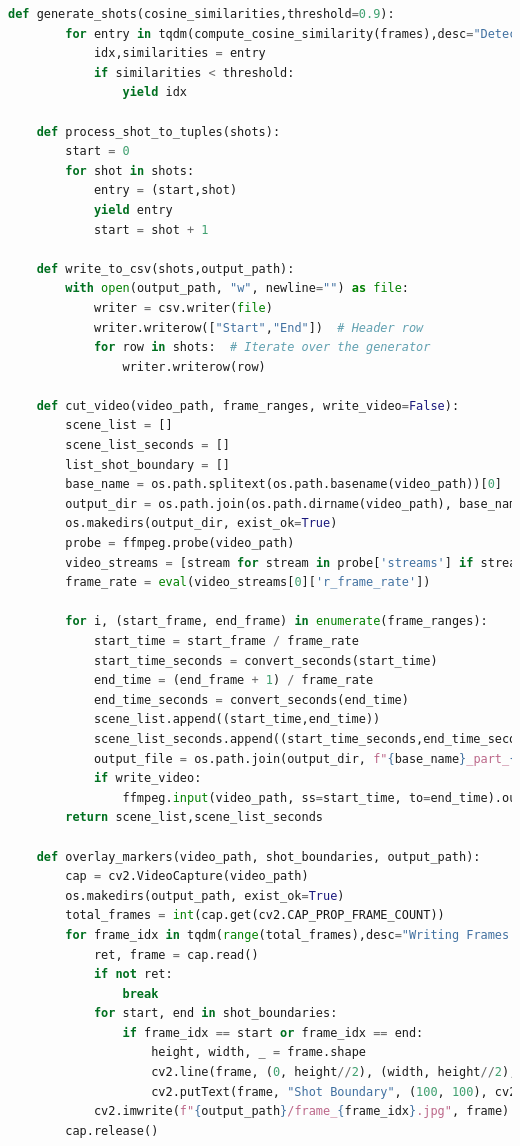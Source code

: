 \documentclass[12pt]{report}
\begin{document}
\begin{lstlisting}[language=Python,caption={Shot Boundary Detection Code}]
	def generate_shots(cosine_similarities,threshold=0.9):
		for entry in tqdm(compute_cosine_similarity(frames),desc="Detecting Shots"):
			idx,similarities = entry
			if similarities < threshold:
				yield idx
				
	def process_shot_to_tuples(shots):
		start = 0
		for shot in shots:
			entry = (start,shot)
			yield entry
			start = shot + 1
			
	def write_to_csv(shots,output_path):
		with open(output_path, "w", newline="") as file:
			writer = csv.writer(file)
			writer.writerow(["Start","End"])  # Header row
			for row in shots:  # Iterate over the generator
				writer.writerow(row)
				
	def cut_video(video_path, frame_ranges, write_video=False):
		scene_list = []
		scene_list_seconds = []
		list_shot_boundary = []
		base_name = os.path.splitext(os.path.basename(video_path))[0]
		output_dir = os.path.join(os.path.dirname(video_path), base_name)
		os.makedirs(output_dir, exist_ok=True)
		probe = ffmpeg.probe(video_path)
		video_streams = [stream for stream in probe['streams'] if stream['codec_type'] == 'video']
		frame_rate = eval(video_streams[0]['r_frame_rate'])
		
		for i, (start_frame, end_frame) in enumerate(frame_ranges):
			start_time = start_frame / frame_rate
			start_time_seconds = convert_seconds(start_time)
			end_time = (end_frame + 1) / frame_rate
			end_time_seconds = convert_seconds(end_time)
			scene_list.append((start_time,end_time))
			scene_list_seconds.append((start_time_seconds,end_time_seconds))
			output_file = os.path.join(output_dir, f"{base_name}_part_{i+1}.mp4")
			if write_video:
				ffmpeg.input(video_path, ss=start_time, to=end_time).output(output_file).run()
		return scene_list,scene_list_seconds
		
	def overlay_markers(video_path, shot_boundaries, output_path):
		cap = cv2.VideoCapture(video_path)
		os.makedirs(output_path, exist_ok=True)
		total_frames = int(cap.get(cv2.CAP_PROP_FRAME_COUNT))
		for frame_idx in tqdm(range(total_frames),desc="Writing Frames to Disk:"):
			ret, frame = cap.read()
			if not ret:
				break
			for start, end in shot_boundaries:
				if frame_idx == start or frame_idx == end:
					height, width, _ = frame.shape
					cv2.line(frame, (0, height//2), (width, height//2), (0, 0, 255), 5)
					cv2.putText(frame, "Shot Boundary", (100, 100), cv2.FONT_HERSHEY_SIMPLEX, 1, (0, 0, 255), 3)
			cv2.imwrite(f"{output_path}/frame_{frame_idx}.jpg", frame)
		cap.release()
		

\end{lstlisting}
\end{document}

